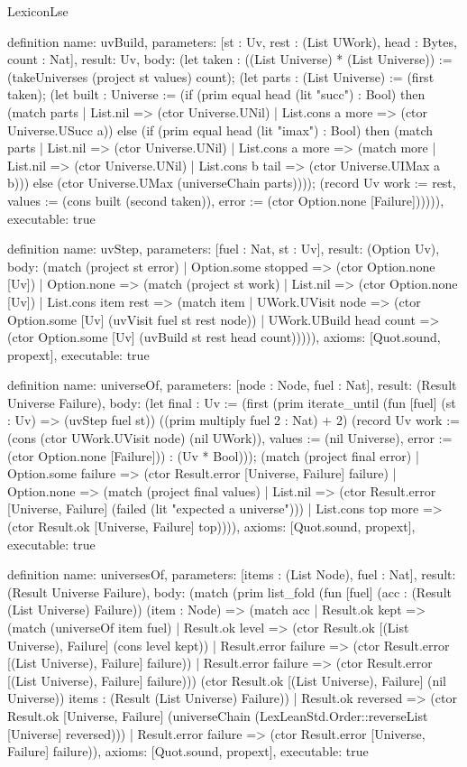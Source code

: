 \begin{lexlean}{LexiconLse}
\begin{semanticmodule}
definition{
  name: uvBuild,
  parameters: [st : Uv, rest : (List UWork), head : Bytes, count : Nat],
  result: Uv,
  body: (let taken : ((List Universe) * (List Universe)) := (takeUniverses (project st values) count); (let parts : (List Universe) := (first taken); (let built : Universe := (if (prim equal head (lit "succ") : Bool) then (match parts
    | List.nil => (ctor Universe.UNil)
    | List.cons a more => (ctor Universe.USucc a)) else (if (prim equal head (lit "imax") : Bool) then (match parts
    | List.nil => (ctor Universe.UNil)
    | List.cons a more => (match more
      | List.nil => (ctor Universe.UNil)
      | List.cons b tail => (ctor Universe.UIMax a b))) else (ctor Universe.UMax (universeChain parts)))); (record Uv {work := rest, values := (cons built (second taken)), error := (ctor Option.none [Failure])})))),
  executable: true
}

definition{
  name: uvStep,
  parameters: [fuel : Nat, st : Uv],
  result: (Option Uv),
  body: (match (project st error)
    | Option.some stopped => (ctor Option.none [Uv])
    | Option.none => (match (project st work)
      | List.nil => (ctor Option.none [Uv])
      | List.cons item rest => (match item
        | UWork.UVisit node => (ctor Option.some [Uv] (uvVisit fuel st rest node))
        | UWork.UBuild head count => (ctor Option.some [Uv] (uvBuild st rest head count))))),
  axioms: [Quot.sound, propext],
  executable: true
}

definition{
  name: universeOf,
  parameters: [node : Node, fuel : Nat],
  result: (Result Universe Failure),
  body: (let final : Uv := (first (prim iterate_until (fun [fuel] (st : Uv) => (uvStep fuel st)) ((prim multiply fuel 2 : Nat) + 2) (record Uv {work := (cons (ctor UWork.UVisit node) (nil UWork)), values := (nil Universe), error := (ctor Option.none [Failure])}) : (Uv * Bool))); (match (project final error)
    | Option.some failure => (ctor Result.error [Universe, Failure] failure)
    | Option.none => (match (project final values)
      | List.nil => (ctor Result.error [Universe, Failure] (failed (lit "expected a universe")))
      | List.cons top more => (ctor Result.ok [Universe, Failure] top)))),
  axioms: [Quot.sound, propext],
  executable: true
}

definition{
  name: universesOf,
  parameters: [items : (List Node), fuel : Nat],
  result: (Result Universe Failure),
  body: (match (prim list_fold (fun [fuel] (acc : (Result (List Universe) Failure)) (item : Node) => (match acc
      | Result.ok kept => (match (universeOf item fuel)
        | Result.ok level => (ctor Result.ok [(List Universe), Failure] (cons level kept))
        | Result.error failure => (ctor Result.error [(List Universe), Failure] failure))
      | Result.error failure => (ctor Result.error [(List Universe), Failure] failure))) (ctor Result.ok [(List Universe), Failure] (nil Universe)) items : (Result (List Universe) Failure))
    | Result.ok reversed => (ctor Result.ok [Universe, Failure] (universeChain (LexLeanStd.Order::reverseList [Universe] reversed)))
    | Result.error failure => (ctor Result.error [Universe, Failure] failure)),
  axioms: [Quot.sound, propext],
  executable: true
}


\end{semanticmodule}
\end{lexlean}
